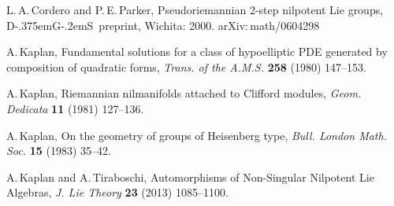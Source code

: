 \documentclass[11 pt]{article}
\newcommand{\DGS}{D{\kern-.375em}G{\kern-.2em}S}
\begin{document}
\begin{thebibliography}{99}
L.\,A.\,Cordero and P.\,E.\,Parker, Pseudoriemannian 2-step
nilpotent Lie groups, \DGS\ preprint, Wichita: 2000.
{\sf arXiv:\,math/0604298}

A.\,Kaplan, Fundamental solutions for a class of hypoelliptic PDE
generated by composition of quadratic forms, {\it Trans. of the A.M.S.}
{\bf 258}
(1980) 147--153.

A.\,Kaplan, Riemannian nilmanifolds attached to Clifford modules,
{\it Geom. Dedicata} {\bf 11} (1981) 127--136.

A.\,Kaplan, On the geometry of groups of Heisenberg type, {\it Bull.
London Math. Soc.} {\bf 15} (1983) 35--42.

A.\,Kaplan and A.\,Tiraboschi, Automorphisms of Non-Singular
Nilpotent Lie Algebras, {\it J. Lie Theory} {\bf 23} (2013) 1085--1100.
\end{thebibliography}
\end{document}
